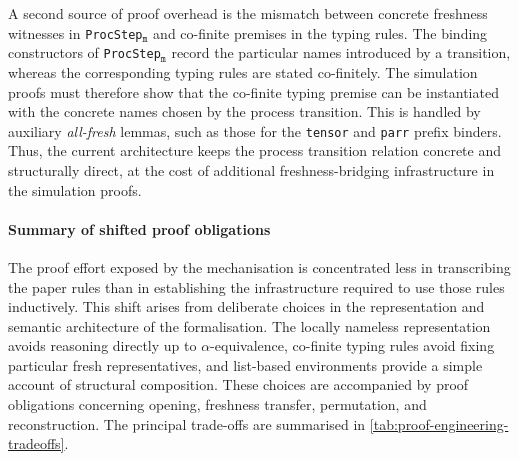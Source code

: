 A second source of proof overhead is the mismatch between concrete freshness witnesses in \texttt{ProcStep}$_{\texttt{m}}$ and co-finite premises in the typing rules. The binding constructors of \texttt{ProcStep}$_{\texttt{m}}$ record the particular names introduced by a transition, whereas the corresponding typing rules are stated co-finitely. The simulation proofs must therefore show that the co-finite typing premise can be instantiated with the concrete names chosen by the process transition. This is handled by auxiliary \emph{all-fresh} lemmas, such as those for the \texttt{tensor} and \texttt{parr} prefix binders. Thus, the current architecture keeps the process transition relation concrete and structurally direct, at the cost of additional freshness-bridging infrastructure in the simulation proofs.

\paragraph{Summary of shifted proof obligations}
The proof effort exposed by the mechanisation is concentrated less in transcribing the paper rules than in establishing the infrastructure required to use those rules inductively. This shift arises from deliberate choices in the representation and semantic architecture of the formalisation. The locally nameless representation avoids reasoning directly up to $\alpha$-equivalence, co-finite typing rules avoid fixing particular fresh representatives, and list-based environments provide a simple account of structural composition. These choices are accompanied by proof obligations concerning opening, freshness transfer, permutation, and reconstruction. The principal trade-offs are summarised in \cref{tab:proof-engineering-tradeoffs}.

